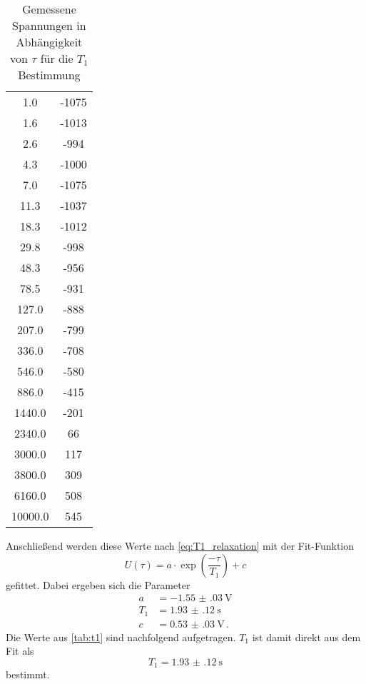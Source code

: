 \begin{table}
    \centering
    \caption{Gemessene Spannungen in Abhängigkeit von $\tau$ für die $T_1$ Bestimmung}
    \label{tab:t1}
    \begin{tabular}{S[table-format=5.1] S[table-format=-4.0]}
        \toprule
        \tableSI{\tau}{\milli\second} &   \\
         &  -1075  \\
        1.6 & -1013 \\
        2.6 & -994 \\
        4.3 & -1000 \\
        7.0 & -1075 \\
        11.3 & -1037 \\
        18.3 & -1012 \\
        29.8 & -998 \\
        48.3 & -956 \\
        78.5 & -931 \\
        127.0 & -888 \\
        207.0 & -799 \\
        336.0 & -708 \\
        546.0 & -580 \\
        886.0 & -415 \\
        1440.0 & -201 \\
        2340.0 & 66 \\
        3000.0 & 117 \\
        3800.0 & 309 \\
        6160.0 & 508 \\
        10000.0 & 545 \\
        \bottomrule
    \end{tabular}
\end{table}

Anschließend werden diese Werte nach \autoref{eq:T1_relaxation} mit der Fit-Funktion
\begin{equation}
    U(\tau) = a \cdot \exp(\frac{- \tau}{T_1}) + c 
    \label{eq:fit_t1}
\end{equation}
gefittet.
Dabei ergeben sich die Parameter 
\begin{align*}
    a &= \SI{-1.55(03)}{\volt} \\
    T_1 &= \SI{1.93(12)}{\second} \\
    c &=  \SI{0.53(03)}{\volt} \, .
\end{align*}
Die Werte aus \autoref{tab:t1} sind nachfolgend aufgetragen.
$T_1$ ist damit direkt aus dem Fit als 
\begin{equation*}
    T_1 = \SI{1.93(12)}{\second}
\end{equation*}
bestimmt.

